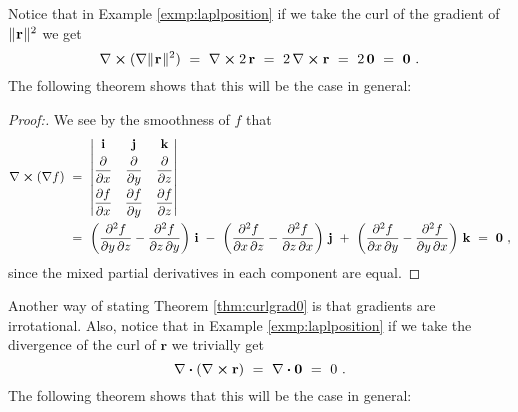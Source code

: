 Notice that in Example \ref{exmp:laplposition} if we take the curl of the gradient of $\lVert\mspace{1mu}\mathbf{r}\mspace{1mu}\rVert^2$ we get
\begin{displaymath}
 \nabla \bm{\times} ( \nabla \lVert\mspace{1mu}\mathbf{r}\mspace{1mu}\rVert^2 ) ~=~ \nabla \bm{\times} 2\,\mathbf{r} ~=~
 2\,\nabla \bm{\times} \mathbf{r} ~=~ 2\,\mathbf{0} ~=~ \mathbf{0} ~.
\end{displaymath}
The following theorem shows that this will be the case in general:

\begin{proofbar}\begin{proof}[Proof:]
 We see by the smoothness of $f$ that
 \begin{align*}
  \Crossprod{\nabla}{(\nabla f)} ~&=~ \begin{vmatrix}
   \mathbf{i} & \mathbf{j} & \mathbf{k} \smallskip\\ \dfrac{\partial}{\partial x} & \dfrac{\partial}{\partial y} &
    \dfrac{\partial}{\partial z} \smallskip\\
   \dfrac{\partial f}{\partial x} & \dfrac{\partial f}{\partial y} & \dfrac{\partial f}{\partial z}
   \end{vmatrix}\\
  &=~ \left( \frac{\partial^2 f}{\partial y\,\partial z}-\frac{\partial^2 f}{\partial z\,\partial y} \right) \,\mathbf{i}
   ~-~ \left( \frac{\partial^2 f}{\partial x\,\partial z}-\frac{\partial^2 f}{\partial z\,\partial x} \right) \,\mathbf{j}
   ~+~ \left( \frac{\partial^2 f}{\partial x\,\partial y}-\frac{\partial^2 f}{\partial y\,\partial x} \right) \,\mathbf{k}
  ~=~ \mathbf{0} ~,
 \end{align*}
 since the mixed partial derivatives in each component are equal.
\end{proof}\end{proofbar}


Another way of stating Theorem \ref{thm:curlgrad0} is that gradients are irrotational. 
Also,
notice that in Example \ref{exmp:laplposition} if we take the divergence of the curl of $\mathbf{r}$ we trivially get
\begin{displaymath}
 \nabla \bm{\cdot} (\nabla \bm{\times} \mathbf{r}) ~=~ \nabla \bm{\cdot} \mathbf{0} ~=~ 0 ~.
\end{displaymath}
The following theorem shows that this will be the case in general:

